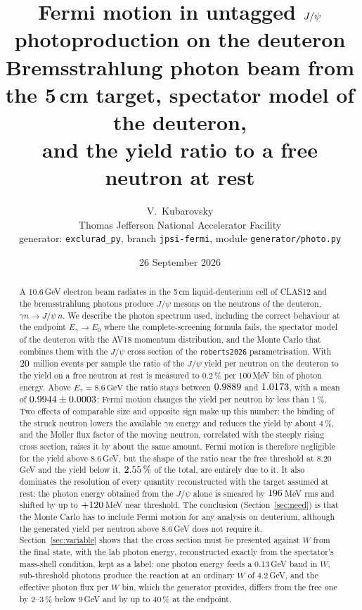\documentclass[11pt,a4paper]{article}
\title{Fermi motion in untagged $\jpsi$ photoproduction on the deuteron\\
\large Bremsstrahlung photon beam from the 5\,cm target, spectator model of the deuteron,\\
and the yield ratio to a free neutron at rest}
\author{V.~Kubarovsky\\ \small Thomas Jefferson National Accelerator Facility\\
\small generator: \texttt{exclurad\_py}, branch \texttt{jpsi-fermi}, module \texttt{generator/photo.py}}
\date{26 September 2026}
\newcommand{\Eg}{E_\gamma}
\newcommand{\jpsi}{J/\psi}
\newcommand{\GeV}{\,\mathrm{GeV}}
\begin{document}
\pagestyle{plain}
\maketitle

\begin{abstract}
\noindent
A 10.6\,GeV electron beam radiates in the 5\,cm liquid-deuterium cell of CLAS12 and the bremsstrahlung
photons produce $\jpsi$ mesons on the neutrons of the deuteron, $\gamma n\to\jpsi\,n$.  We describe the
photon spectrum used, including the correct behaviour at the endpoint $\Eg\to E_0$ where the
complete-screening formula fails, the spectator model of the deuteron with the AV18 momentum
distribution, and the Monte Carlo that combines them with the $\jpsi$ cross section of the
\texttt{roberts2026} parametrisation.  With $20$ million events per sample the ratio of the $\jpsi$
yield per neutron on the deuteron to the yield on a free neutron at rest is measured to \num{0.2}\,\%
per 100\,MeV bin of photon energy.  Above $\Eg=8.6\GeV$ the ratio stays between $0.9889$ and
$1.0173$, with a mean of $0.9944\pm0.0003$: Fermi motion changes the yield per neutron by less
than 1\,\%.  Two effects of comparable size and opposite sign make up this
number: the binding of the struck neutron lowers the available $\gamma n$ energy and reduces the yield
by about 4\,\%, and the M\o{}ller flux factor of the moving neutron, correlated with the steeply
rising cross section, raises it by about the same amount.  Fermi motion is therefore negligible for the
yield above 8.6\,GeV, but the shape of the ratio near the free threshold at 8.20\,GeV and the yield
below it, $2.55\,\%$ of the total, are entirely due to it.  It also dominates the resolution of
every quantity reconstructed with the target assumed at rest: the photon energy obtained from the
$\jpsi$ alone is smeared by $196$\,MeV rms and shifted by up to $+120$\,MeV near threshold.  The
conclusion (Section~\ref{sec:need}) is that the Monte Carlo has to include Fermi motion for any
analysis on deuterium, although the generated yield per neutron above 8.6\,GeV does not require it.
Section~\ref{sec:variable} shows that the cross section must be presented against $W$ from the
final state, with the lab photon energy, reconstructed exactly from the spectator's mass-shell
condition, kept as a label: one photon energy feeds a 0.13\,GeV band in $W$, sub-threshold
photons produce the reaction at an ordinary $W$ of 4.2\,GeV, and the effective photon flux per
$W$ bin, which the generator provides, differs from the free one by 2--3\,\% below 9\,GeV and by
up to 40\,\% at the endpoint.
\end{abstract}
\end{document}
